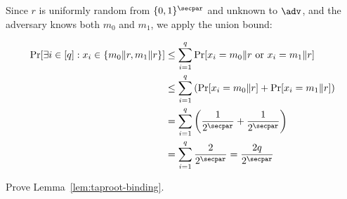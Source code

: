 \begin{mysolution}
Since $r$ is uniformly random from $\{0,1\}^\secpar$ and unknown to $\adv$, and the adversary knows both $m_0$ and $m_1$, we apply the union bound:

\begin{align*}
  \Pr[\exists i \in [q] : x_i \in \{m_0 \| r, m_1 \| r\}] &\leq \sum_{i=1}^q \Pr[x_i = m_0 \| r \text{ or } x_i = m_1 \| r] \\
  &\leq \sum_{i=1}^q \left(\Pr[x_i = m_0 \| r] + \Pr[x_i = m_1 \| r]\right) \\
  &= \sum_{i=1}^q \left(\frac{1}{2^\secpar} + \frac{1}{2^\secpar}\right) \\
  &= \sum_{i=1}^q \frac{2}{2^\secpar} = \frac{2q}{2^\secpar}
\end{align*}
\end{mysolution}
\fi

\begin{exercise}\label{ex:taproot-binding}
  Prove Lemma~\ref{lem:taproot-binding}.
\end{exercise}

